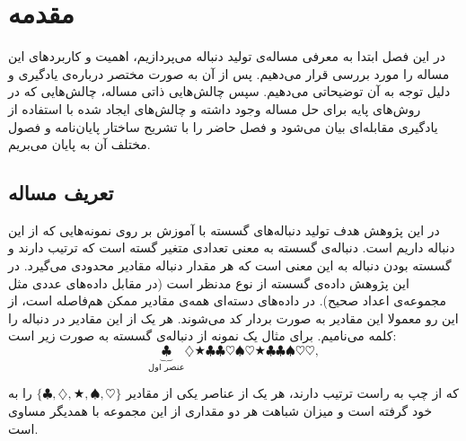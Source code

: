 \chapter{مقدمه}\label{Chap:Chap1}
\minitoc
در این فصل ابتدا به معرفی مساله‌ی تولید دنباله می‌پردازیم، اهمیت و کاربرد‌های این مساله را مورد بررسی قرار می‌دهیم. پس از آن به صورت مختصر درباره‌ی یادگیری 
و دلیل توجه به آن توضیحاتی می‌دهیم. سپس چالش‌هایی ذاتی مساله، چالش‌هایی که در روش‌های پایه برای حل مساله وجود داشته و چالش‌های ایجاد شده با استفاده از یادگیری مقابله‌ای بیان می‌شود و فصل حاضر را با تشریح ساختار پایان‌نامه و فصول مختلف آن به پایان می‌بریم.
\section{تعریف مساله}
\label{sec:chap1:definition}
در این پژوهش هدف تولید دنباله‌های گسسته با آموزش بر روی نمونه‌هایی که از این دنباله داریم است.
دنباله‌ی گسسته به معنی تعدادی متغیر گسته است که ترتیب دارند و گسسته بودن دنباله به این معنی است که هر مقدار دنباله مقادیر محدودی می‌گیرد. در این پژوهش داده‌ی گسسته از نوع 
مدنظر است (در مقابل داده‌های عددی مثل مجموعه‌ی اعداد صحیح). در داده‌های دسته‌ای همه‌ی مقادیر ممکن هم‌فاصله است، از این رو معمولا این مقادیر به صورت بردار
کد می‌شوند. هر یک از این مقادیر در دنباله را کلمه می‌نامیم.
\newpage
برای مثال یک نمونه از دنباله‌ی گسسته به صورت زیر است:
\begin{equation*}
\underbrace{\clubsuit}_{\text{عنصر اول}}
 \diamondsuit \bigstar \clubsuit \clubsuit \heartsuit \spadesuit \heartsuit \bigstar \clubsuit \clubsuit \spadesuit \heartsuit \heartsuit,
\end{equation*}

که از چپ به راست ترتیب دارند، هر یک از عناصر یکی از مقادیر 
$\{ \clubsuit , \diamondsuit ,\bigstar , \spadesuit , \heartsuit \} $
را به خود گرفته است و میزان شباهت هر دو مقداری از این مجموعه با همدیگر مساوی است.
